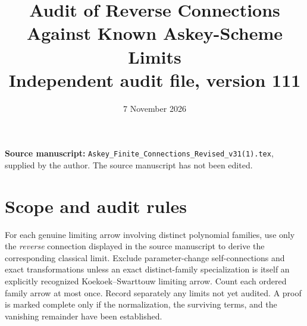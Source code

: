 \documentclass[11pt]{article}
\title{Audit of Reverse Connections Against Known Askey-Scheme Limits\\\large Independent audit file, version 111}
\author{}
\date{7 November 2026}
\begin{document}
\maketitle
\noindent\textbf{Source manuscript:} \texttt{Askey\_Finite\_Connections\_Revised\_v31(1).tex}, supplied by the author. The source manuscript has not been edited.

\section*{Scope and audit rules}
For each genuine limiting arrow involving distinct polynomial families, use only the \emph{reverse} connection displayed in the source manuscript to derive the corresponding classical limit. Exclude parameter-change self-connections and exact transformations unless an exact distinct-family specialization is itself an explicitly recognized Koekoek--Swarttouw limiting arrow. Count each ordered family arrow at most once. Record separately any limits not yet audited. A proof is marked complete only if the normalization, the surviving terms, and the vanishing remainder have been established.
\end{document}
